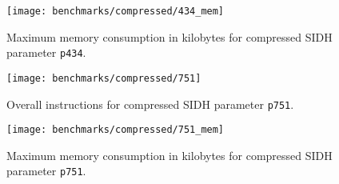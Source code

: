 \begin{figure}[H]
  \centering
  \texttt{[image: benchmarks/compressed/434\_mem]}
  \caption[Maximum memory consumption compressed p434]
  {Maximum memory consumption in kilobytes for compressed SIDH parameter \texttt{p434}.}
  \label{fig:results_comp_434_mem}
\end{figure}

\begin{figure}[H]
  \centering
  \texttt{[image: benchmarks/compressed/751]}
  \caption[Overall instructions compressed p751]
  {Overall instructions for compressed SIDH parameter \texttt{p751}.}
  \label{fig:results_comp_751}
\end{figure}

\begin{figure}[H]
  \centering
  \texttt{[image: benchmarks/compressed/751\_mem]}
  \caption[Maximum memory consumption compressed p751]
  {Maximum memory consumption in kilobytes for compressed SIDH parameter \texttt{p751}.}
  \label{fig:results_comp_751_mem}
\end{figure}

